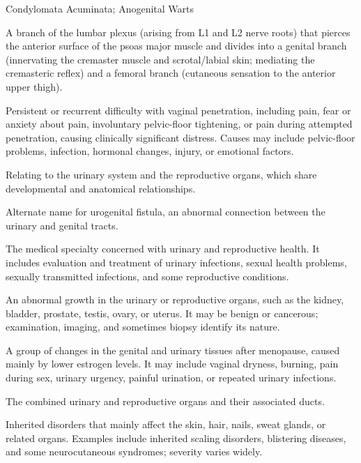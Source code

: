 \synonyms
Condylomata Acuminata; Anogenital Warts

 A branch of the lumbar plexus (arising from L1 and L2 nerve roots) that pierces the anterior surface of the psoas major muscle and divides into a genital branch (innervating the cremaster muscle and scrotal/labial skin; mediating the cremasteric reflex) and a femoral branch (cutaneous sensation to the anterior upper thigh).

 Persistent or recurrent difficulty with vaginal penetration, including pain, fear or anxiety about pain, involuntary pelvic-floor tightening, or pain during attempted penetration, causing clinically significant distress. Causes may include pelvic-floor problems, infection, hormonal changes, injury, or emotional factors.

 Relating to the urinary system and the reproductive organs, which share developmental and anatomical relationships.

 Alternate name for urogenital fistula, an abnormal connection between the urinary and genital tracts.

 The medical specialty concerned with urinary and reproductive health. It includes evaluation and treatment of urinary infections, sexual health problems, sexually transmitted infections, and some reproductive conditions.

 An abnormal growth in the urinary or reproductive organs, such as the kidney, bladder, prostate, testis, ovary, or uterus. It may be benign or cancerous; examination, imaging, and sometimes biopsy identify its nature.

 A group of changes in the genital and urinary tissues after menopause, caused mainly by lower estrogen levels. It may include vaginal dryness, burning, pain during sex, urinary urgency, painful urination, or repeated urinary infections.

 The combined urinary and reproductive organs and their associated ducts.

 Inherited disorders that mainly affect the skin, hair, nails, sweat glands, or related organs. Examples include inherited scaling disorders, blistering diseases, and some neurocutaneous syndromes; severity varies widely.

